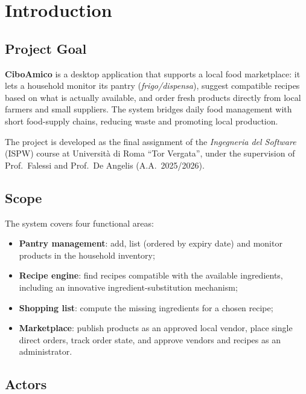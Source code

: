 \chapter{Introduction}\label{ch:intro}

\section{Project Goal}

\textbf{CiboAmico} is a desktop application that supports a local food
marketplace: it lets a household monitor its pantry (\emph{frigo/dispensa}),
suggest compatible recipes based on what is actually available, and order fresh
products directly from local farmers and small suppliers. The system bridges
daily food management with short food-supply chains, reducing waste and
promoting local production.

The project is developed as the final assignment of the \emph{Ingegneria del
Software} (ISPW) course at Università di Roma ``Tor Vergata'', under the
supervision of Prof.\ Falessi and Prof.\ De Angelis (A.A.\ 2025/2026).

\section{Scope}

The system covers four functional areas:
\begin{itemize}
    \item \textbf{Pantry management}: add, list (ordered by expiry date) and
    monitor products in the household inventory;
    \item \textbf{Recipe engine}: find recipes compatible with the available
    ingredients, including an innovative ingredient-substitution mechanism;
    \item \textbf{Shopping list}: compute the missing ingredients for a chosen
    recipe;
    \item \textbf{Marketplace}: publish products as an approved local vendor,
    place single direct orders, track order state, and approve vendors and
    recipes as an administrator.
\end{itemize}

\section{Actors}

